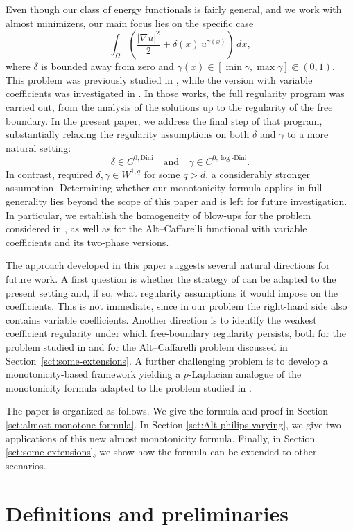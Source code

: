 \documentclass[reqno,11pt]{amsart}
\newcommand{\1}{\mathds{1}}  %
\numberwithin{equation}{section}
\begin{document}
Even though our class of energy functionals is fairly general, and we work with almost minimizers, our main focus lies on the specific case
\[
	\int_{\Omega} \left( \frac{|\nabla u|^2}{2} + \delta(x)\,u^{\gamma(x)} \right)\,dx,
\]
where $\delta$ is bounded away from zero and $\gamma(x) \in [\min \gamma, \max \gamma] \Subset (0,1)$. This problem was previously studied in \cite{ASTU1}, while the version with variable coefficients was investigated in \cite{ASTU2}. In those works, the full regularity program was carried out, from the analysis of the solutions up to the regularity of the free boundary. In the present paper, we address the final step of that program, substantially relaxing the regularity assumptions on both $\delta$ and $\gamma$ to a more natural setting:
\[
	\delta \in C^{0,\text{Dini}} \quad \text{and} \quad \gamma \in C^{0,\log\text{-Dini}}.
\]
In contrast, \cite{ASTU1} required $\delta,\gamma \in W^{1,q}$ for some $q>d$, a considerably stronger assumption. Determining whether our monotonicity formula applies in full generality lies beyond the scope of this paper and is left for future investigation. In particular, we establish the homogeneity of blow-ups for the problem considered in \cite{ASTU2}, as well as for the Alt--Caffarelli functional with variable coefficients and its two-phase versions.

The approach developed in this paper suggests several natural directions for future work. A first question is whether the strategy of \cite{AKS} can be adapted to the present setting and, if so, what regularity assumptions it would impose on the coefficients. This is not immediate, since in our problem the right-hand side also contains variable coefficients. Another direction is to identify the weakest coefficient regularity under which free-boundary regularity persists, both for the problem studied in \cite{ASTU2} and for the Alt--Caffarelli problem discussed in Section~\ref{sct:some-extensions}. A further challenging problem is to develop a monotonicity-based framework yielding a \(p\)-Laplacian analogue of the monotonicity formula adapted to the problem studied in \cite{STU}.

The paper is organized as follows. We give the formula and proof in Section \ref{sct:almost-monotone-formula}. In Section \ref{sct:Alt-philips-varying}, we give two applications of this new almost monotonicity formula. Finally, in Section \ref{sct:some-extensions}, we show how the formula can be extended to other scenarios.

\section{Definitions and preliminaries}\label{sct:prelim}
\end{document}
